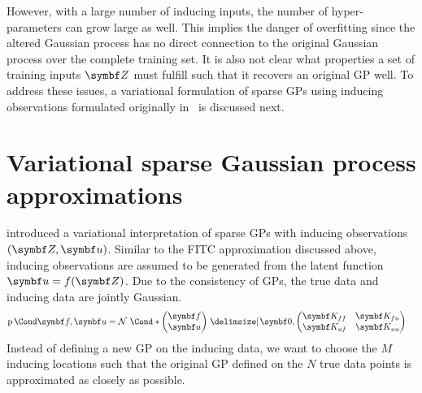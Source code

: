 However, with a large number of inducing inputs, the number of hyper-parameters can grow large as well.
This implies the danger of overfitting since the altered Gaussian process has no direct connection to the original Gaussian process over the complete training set.
It is also not clear what properties a set of training inputs $\mat{Z}$ must fulfill such that it recovers an original GP well.
To address these issues, a variational formulation of sparse GPs using inducing observations formulated originally in~\parencite{titsias_variational_2009,hensman_gaussian_2013} is discussed next.

\section{Variational sparse Gaussian process approximations}
\label{toc:gp:sparse_gps}
\Textcite{titsias_variational_2009} introduced a variational interpretation of sparse GPs with inducing observations $(\mat{Z}, \mat{u})$.
Similar to the FITC approximation discussed above, inducing observations are assumed to be generated from the latent function $\mat{u} = f(\mat{Z})$.
Due to the consistency of GPs, the true data and inducing data are jointly Gaussian.
\begin{align}
    \label{eq:gp:augmented_model}
    \Prob{\mat{f}, \mat{u}} & = \Gaussian*{\begin{pmatrix} \mat{f} \\ \mat{u}\end{pmatrix} \given \mat{0}, \begin{pmatrix} \mat{K_{ff}} & \mat{K_{fu}} \\ \mat{K_{uf}} & \mat{K_{uu}} \end{pmatrix}}
\end{align}
Instead of defining a new GP on the inducing data, we want to choose the $M$ inducing locations such that the original GP defined on the $N$ true data points is approximated as closely as possible.

